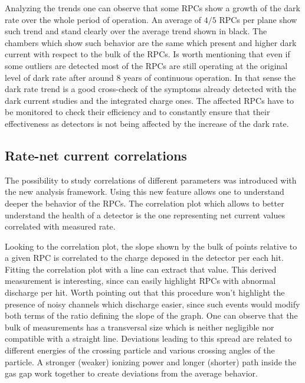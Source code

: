 Analyzing the trends one can observe that some RPCs show a growth of the dark rate over the whole period of operation.
An average of $4/5$ RPCs per plane show such trend and stand clearly over the average trend shown in black.
The chambers which show such behavior are the same which present and higher dark current with respect to the bulk of the RPCs.
Is worth mentioning that even if some outliers are detected most of the RPCs are still operating at the original level of dark rate after around 8 years of continuous operation.
In that sense the dark rate trend is a good cross-check of the symptoms already detected with the dark current studies and the integrated charge ones.
The affected RPCs have to be monitored to check their efficiency and to constantly ensure that their effectiveness as detectors is not being affected by the increase of the dark rate.

\subsection{Rate-net current correlations}
The possibility to study correlations of different parameters was introduced with the new analysis framework.
Using this new feature allows one to understand deeper the behavior of the RPCs.
The correlation plot which allows to better understand the health of a detector is the one representing net current values correlated with measured rate.

Looking to the correlation plot, the slope shown by the bulk of points relative to a given RPC is correlated to the charge deposed in the detector per each hit.
Fitting the correlation plot with a line can extract that value.
This derived measurement is interesting, since can easily highlight RPCs with abnormal discharge per hit.
Worth pointing out that this procedure won't highlight the presence of noisy channels which discharge easier, since such events would modify both terms of the ratio defining the slope of the graph.
One can observe that the bulk of measurements has a transversal size which is neither negligible nor compatible with a straight line.
Deviations leading to this spread are related to different energies of the crossing particle and various crossing angles of the particle.
A stronger (weaker) ionizing power and longer (shorter) path inside the gas gap work together to create deviations from the average behavior.

